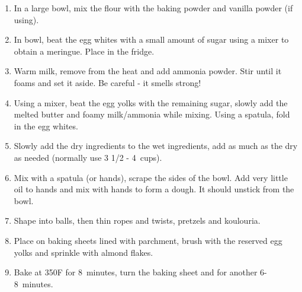 \begin{enumerate}
    \item In a large bowl, mix the flour with the baking powder and vanilla powder (if using).
    \item In bowl, beat the egg whites with a small amount of sugar using a mixer to obtain a meringue. Place in the fridge.
    \item Warm milk, remove from the heat and add ammonia powder. Stir until it foams and set it aside. Be careful - it smells strong!
    \item Using a mixer, beat the egg yolks with the remaining sugar, slowly add the melted butter and foamy milk/ammonia while mixing. Using a spatula, fold in the egg whites.
    \item Slowly add the dry ingredients to the wet ingredients, add as much as the dry as needed (normally use 3 1/2 - 4~cups).
    \item Mix with a spatula (or hands), scrape the sides of the bowl. Add very little oil to hands and mix with hands to form a dough. It should unstick from the bowl.
    \item Shape into balls, then thin ropes and twists, pretzels and koulouria.
    \item Place on baking sheets lined with parchment, brush with the reserved egg yolks and sprinkle with almond flakes.
    \item Bake at 350\degree F for 8~minutes, turn the baking sheet and for another 6-8~minutes.
\end{enumerate}

